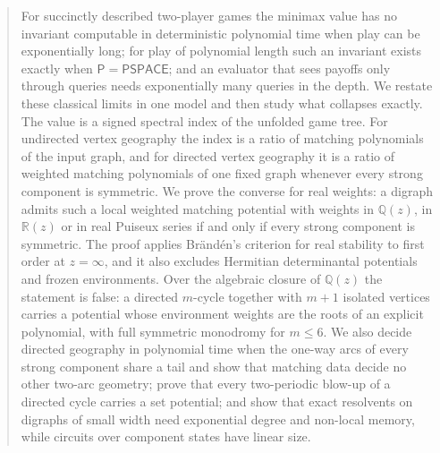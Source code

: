 \documentclass[11pt]{amsart}
\theoremstyle{plain}
\theoremstyle{definition}
\theoremstyle{remark}
\numberwithin{equation}{section}
\newcommand{\QQ}{\mathbb{Q}}
\newcommand{\RR}{\mathbb{R}}
\newcommand{\Qz}{\QQ(z)}
\newcommand{\Rz}{\RR(z)}
\newcommand{\cls}[1]{\mathsf{#1}}
\newcommand{\PSPACE}{\cls{PSPACE}}
\newcommand{\Pclass}{\cls{P}}
\begin{document}
\begin{abstract}
For succinctly described two-player games the minimax value has no invariant computable in deterministic polynomial time when play can be exponentially long; for play of polynomial length such an invariant exists exactly when $\Pclass=\PSPACE$; and an evaluator that sees payoffs only through queries needs exponentially many queries in the depth. We restate these classical limits in one model and then study what collapses exactly. The value is a signed spectral index of the unfolded game tree. For undirected vertex geography the index is a ratio of matching polynomials of the input graph, and for directed vertex geography it is a ratio of weighted matching polynomials of one fixed graph whenever every strong component is symmetric. We prove the converse for real weights: a digraph admits such a local weighted matching potential with weights in $\Qz$, in $\Rz$ or in real Puiseux series if and only if every strong component is symmetric. The proof applies Br\"and\'en's criterion for real stability to first order at $z=\infty$, and it also excludes Hermitian determinantal potentials and frozen environments. Over the algebraic closure of $\Qz$ the statement is false: a directed $m$-cycle together with $m+1$ isolated vertices carries a potential whose environment weights are the roots of an explicit polynomial, with full symmetric monodromy for $m\le6$. We also decide directed geography in polynomial time when the one-way arcs of every strong component share a tail and show that matching data decide no other two-arc geometry; prove that every two-periodic blow-up of a directed cycle carries a set potential; and show that exact resolvents on digraphs of small width need exponential degree and non-local memory, while circuits over component states have linear size.
\end{abstract}
\end{document}
